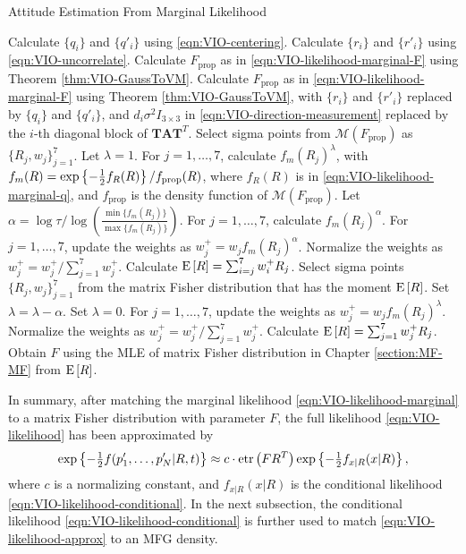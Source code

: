 \begin{table}
	\caption{Attitude Estimation From Marginal Likelihood}
	\label{tab:VIO-marginal}
	\begin{algorithmic}[1]
		\algrule[0.8pt]
		\algrule
		\State Calculate $\{q_i\}$ and $\{q'_i\}$ using \eqref{eqn:VIO-centering}.
		\State Calculate $\{r_i\}$ and $\{r'_i\}$ using \eqref{eqn:VIO-uncorrelate}.
		\State Calculate $F_\text{prop}$ as in \eqref{eqn:VIO-likelihood-marginal-F} using Theorem \ref{thm:VIO-GaussToVM}.
		\Else
		\State Calculate $F_\text{prop}$ as in \eqref{eqn:VIO-likelihood-marginal-F} using Theorem \ref{thm:VIO-GaussToVM}, with $\{r_i\}$ and $\{r'_i\}$ replaced by $\{q_i\}$ and $\{q'_i\}$, and $d_i\sigma^2I_{3\times 3}$ in \eqref{eqn:VIO-direction-measurement} replaced by the $i$-th diagonal block of $\mathbf{TAT}^T$.
		\EndIf
		\State Select sigma points \cite{gilitschenski2015unscented,lee2018bayesian} from $\mathcal{M}(F_\text{prop})$ as $\{R_j,w_j\}_{j=1}^7$.
		\State Let $\lambda = 1$.
		\State For $j=1,\ldots,7$, calculate $f_m(R_j)^\lambda$, with $f_m(R) = \exp\left\{ -\tfrac{1}{2}f_R(R) \right\} / f_\text{prop}(R)$, where $f_R(R)$ is in \eqref{eqn:VIO-likelihood-marginal-q}, and $f_\text{prop}$ is the density function of $\mathcal{M}(F_\text{prop})$.
		\State Let $\alpha = \log\tau / \log\left( \tfrac{\min\{f_m(R_j)\}}{\max\{f_m(R_j)\}} \right)$.
		\State For $j=1,\ldots,7$, calculate $f_m(R_j)^\alpha$.
		\State For $j=1,\ldots,7$, update the weights as $w_j^+ = w_j f_m(R_j)^\alpha$.
		\State Normalize the weights as $w_j^+ = w_j^+/\sum_{j=1}^7 w_j^+$.
		\State Calculate $\mathrm{E}\left[ R \right] = \sum_{i=j}^7 w_i^+ R_j$.
		\State Select sigma points $\{R_j,w_j\}_{j=1}^7$ from the matrix Fisher distribution that has the moment $\mathrm{E}\left[ R \right]$.
		\State Set $\lambda = \lambda-\alpha$.
		\Else
		\State Set $\lambda = 0$.
		\EndIf
		\EndWhile
		\State For $j=1,\ldots,7$, update the weights as $w_j^+ = w_j f_m(R_j)^\lambda$.
		\State Normalize the weights as $w_j^+ = w_j^+/\sum_{j=1}^7 w_j^+$.
		\State Calculate $\mathrm{E}\left[ R \right] = \sum_{j=1}^7 w_j^+ R_j$.
		\State Obtain $F$ using the MLE of matrix Fisher distribution in Chapter \ref{section:MF-MF} from $\mathrm{E}\left[ R \right]$.
		\EndProcedure
		\algrule[0.8pt]
	\end{algorithmic}
\end{table}

In summary, after matching the marginal likelihood \eqref{eqn:VIO-likelihood-marginal} to a matrix Fisher distribution with parameter $F$, the full likelihood \eqref{eqn:VIO-likelihood} has been approximated by
\begin{align} \label{eqn:VIO-likelihood-approx}
	\exp\left\{ -\tfrac{1}{2}f(p'_1,\ldots,p'_N|R,t) \right\} \approx c\cdot \mathrm{etr}\left( FR^T \right) \exp\left\{ -\tfrac{1}{2}f_{x|R}(x|R) \right\},
\end{align}
where $c$ is a normalizing constant, and $f_{x|R}(x|R)$ is the conditional likelihood \eqref{eqn:VIO-likelihood-conditional}.
In the next subsection, the conditional likelihood \eqref{eqn:VIO-likelihood-conditional} is further used to match \eqref{eqn:VIO-likelihood-approx} to an MFG density.

